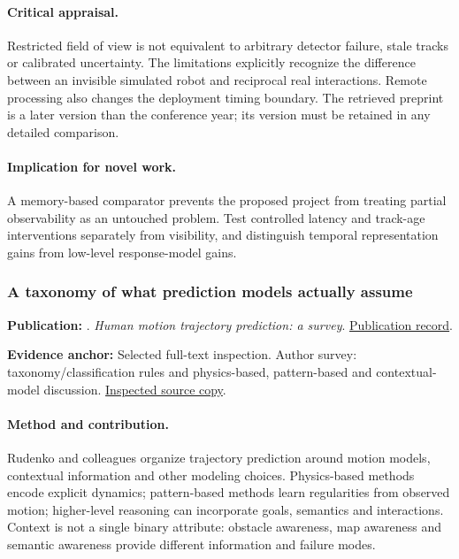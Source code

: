 \paragraph{Critical appraisal.} Restricted field of view is not equivalent to arbitrary detector failure, stale tracks or calibrated uncertainty. The limitations explicitly recognize the difference between an invisible simulated robot and reciprocal real interactions. Remote processing also changes the deployment timing boundary. The retrieved preprint is a later version than the conference year; its version must be retained in any detailed comparison.

\paragraph{Implication for novel work.} A memory-based comparator prevents the proposed project from treating partial observability as an untouched problem. Test controlled latency and track-age interventions separately from visibility, and distinguish temporal representation gains from low-level response-model gains.

\subsubsection{A taxonomy of what prediction models actually assume}\label{paper:prediction}
\textbf{Publication:} \citet{prediction}. \emph{Human motion trajectory prediction: a survey}. \href{https://doi.org/10.1177/0278364920917446}{Publication record}.

\textbf{Evidence anchor:} Selected full-text inspection. Author survey: taxonomy/classification rules and physics-based, pattern-based and contextual-model discussion. \href{https://arxiv.org/pdf/1905.06113}{Inspected source copy}.

\paragraph{Method and contribution.} Rudenko and colleagues organize trajectory prediction around motion models, contextual information and other modeling choices. Physics-based methods encode explicit dynamics; pattern-based methods learn regularities from observed motion; higher-level reasoning can incorporate goals, semantics and interactions. Context is not a single binary attribute: obstacle awareness, map awareness and semantic awareness provide different information and failure modes.

